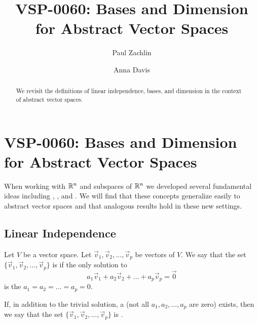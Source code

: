 \documentclass{ximera}
\author{Paul Zachlin \and Anna Davis} \title{VSP-0060: Bases and Dimension for Abstract Vector Spaces} \license{CC-BY 4.0}
\begin{document}
\begin{abstract}
We revisit the definitions of linear independence, bases, and dimension in the context of abstract vector spaces.
\end{abstract}
\maketitle


\section*{VSP-0060: Bases and Dimension for Abstract Vector Spaces}
When working with $\mathbb{R}^n$ and subspaces of $\mathbb{R}^n$ we developed several fundamental ideas including , ,  and .  We will find that these concepts generalize easily to abstract vector spaces and that analogous results hold in these new settings.
\subsection*{Linear Independence}
\begin{definition}\label{def:linearindependenceabstract}
Let $V$ be a vector space.  Let $\vec{v}_1, \vec{v}_2,\ldots ,\vec{v}_p$ be vectors of $V$.  We say that the set $\{\vec{v}_1, \vec{v}_2,\ldots ,\vec{v}_p\}$ is  if the only solution to 
$$a_1\vec{v}_1+a_2\vec{v}_2+\ldots +a_p\vec{v}_p=\vec{0}$$
is the  $a_1=a_2=\ldots =a_p=0$.

If, in addition to the trivial solution, a  (not all $a_1, a_2,\ldots ,a_p$ are zero) exists, then we say that the set $\{\vec{v}_1, \vec{v}_2,\ldots ,\vec{v}_p\}$ is .
\end{definition}
\end{document}
